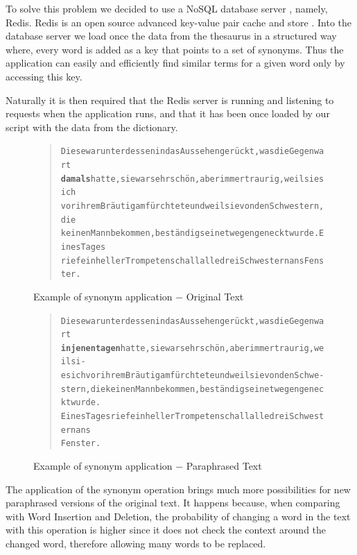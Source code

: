 \documentclass[11pt]{reportAlternative}
\begin{document}
To solve this problem we decided to use a NoSQL database server \cite{NoSQL}, namely, Redis. Redis is an open source advanced key-value pair cache and store \cite{Redis}. Into the database server we load once the data from the thesaurus in a structured way where, every word is added as a key that points to a set of synonyms. Thus the application can easily and efficiently find similar terms for a given word only by accessing this key.

Naturally it is then required that the Redis server is running and listening to requests when the application runs, and that it has been once loaded by our script with the data from the dictionary.

\begin{figure}[H]
\begin{quote}
\begin{alltt}
Diese war unterdessen in das Aussehen gerückt, was die Gegenwart
\textbf{damals} hatte, sie war sehr schön, aber immer traurig, weil sie sich
vor ihrem Bräutigam fürchtete und weil sie von den Schwestern, die
keinen Mann bekommen, beständig seinetwegen geneckt wurde. Eines Tages
rief ein heller Trompetenschall alle drei Schwestern ans Fenster.
\end{alltt}
\end{quote}
\caption{Example of synonym application $-$ Original Text}
\end{figure}

\begin{figure}[H]
\begin{quote}
\begin{alltt}
Diese war unterdessen in das Aussehen gerückt, was die Gegenwart
\textbf{in jenen tagen} hatte, sie war sehr schön, aber immer traurig, weil si-
e sich vor ihrem Bräutigam fürchtete und weil sie von den Schwe-
stern, die keinen Mann bekommen, beständig seinetwegen geneckt wurde.
Eines Tages rief ein heller Trompetenschall alle drei Schwestern ans
Fenster.
\end{alltt}
\end{quote}
\caption{Example of synonym application $-$ Paraphrased Text}
\end{figure}

The application of the synonym operation brings much more possibilities for new paraphrased versions of the original text. It happens because, when comparing with Word Insertion and Deletion, the probability of changing a word in the text with this operation is higher since it does not check the context around the changed word, therefore allowing many words to be replaced.
\end{document}
